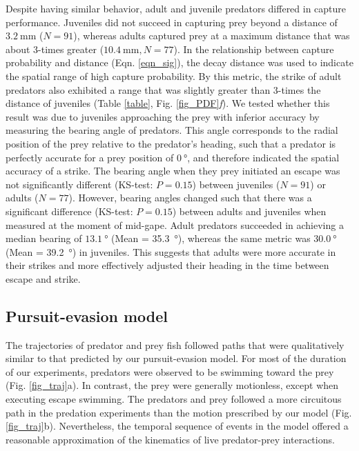\documentclass[]{rsos}%
\begin{document}
Despite having similar behavior, adult and juvenile predators differed in capture performance.
Juveniles did not succeed in capturing prey beyond a distance of $\SI{3.2}{\mm}$ ($N = 91$), whereas adults captured prey at a maximum distance that was about 3-times greater ($\SI{10.4}{\mm}, N = 77$).
In the relationship between capture probability and distance (Eqn. \ref{eqn_sig}), the decay distance was used to indicate the spatial range of high capture probability. 
By this metric, the strike of adult predators also exhibited a range that was slightly greater than 3-times the distance of juveniles (Table \ref{table}, Fig. \ref{fig_PDF}\textit{f}).
We tested whether this result was due to juveniles approaching the prey with inferior accuracy by measuring the bearing angle of predators.
This angle corresponds to the radial position of the prey relative to the predator's heading, such that a predator is perfectly accurate for a prey position of $\SI{0}{\degree}$, and therefore indicated the spatial accuracy of a strike.
The bearing angle when they prey initiated an escape was not significantly different (KS-test: $P = 0.15$) between juveniles ($N = 91$) or adults ($N = 77$).
However, bearing angles changed such that there was a significant difference (KS-test: $P = 0.15$) between adults and juveniles when measured at the moment of mid-gape.
Adult predators succeeded in achieving a median bearing of $\SI{13.1}{\degree}$ (Mean = \SI{35.3}{\degree}), whereas the same metric was $\SI{30.0}{\degree}$ (Mean = \SI{39.2}{\degree}) in juveniles.
This suggests that adults were more accurate in their strikes and more effectively adjusted their heading in the time between escape and strike.


\subsection{Pursuit-evasion model} %
The trajectories of predator and prey fish followed paths that were qualitatively similar to that predicted by our pursuit-evasion model.
For most of the duration of our experiments, predators were observed to be swimming toward the prey (Fig. \ref{fig_traj}a). 
In contrast, the prey were generally motionless, except  when executing escape swimming.
The predators and prey followed a more circuitous path in the predation experiments than the motion prescribed by our model (Fig. \ref{fig_traj}b).
Nevertheless, the temporal sequence of events in the model offered a reasonable approximation of the kinematics of live predator-prey interactions.
\end{document}
